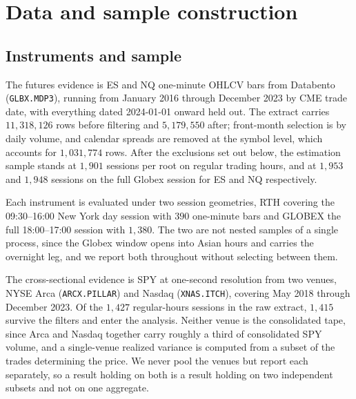 \section{Data and sample construction}\label{sec:data}

\subsection{Instruments and sample}

The futures evidence is ES and NQ one-minute OHLCV bars from Databento
(\texttt{GLBX.MDP3}), running from January 2016 through December 2023 by CME
trade date, with everything dated 2024-01-01 onward held out. The extract carries
$11{,}318{,}126$ rows before filtering and $5{,}179{,}550$ after; front-month %
selection is by daily volume, and calendar spreads are removed at the symbol
level, which accounts for $1{,}031{,}774$ rows. After the exclusions set out %
below, the estimation sample stands at $1{,}901$ sessions per root on regular %
trading hours, and at $1{,}953$ and $1{,}948$ sessions on the full Globex session %
for ES and NQ respectively.

Each instrument is evaluated under two session geometries, RTH covering the
09:30--16:00 New York day session with $390$ one-minute bars and GLOBEX the full %
18:00--17:00 session with $1{,}380$. The two are not nested samples of a single %
process, since the Globex window opens into Asian hours and carries the overnight
leg, and we report both throughout without selecting between them.

The cross-sectional evidence is SPY at one-second resolution from two venues,
NYSE Arca (\texttt{ARCX.PILLAR}) and Nasdaq (\texttt{XNAS.ITCH}), covering May
2018 through December 2023. Of the $1{,}427$ regular-hours sessions in the raw %
extract, $1{,}415$ survive the filters and enter the analysis. Neither venue is %
the consolidated tape, since Arca and Nasdaq together carry roughly a third of %
consolidated SPY volume, and a single-venue realized variance is computed from a
subset of the trades determining the price. We never pool the venues but report
each separately, so a result holding on both is a result holding on two
independent subsets and not on one aggregate.

